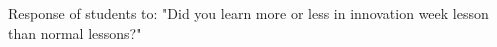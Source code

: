 Response of students to: "Did you learn more or less in innovation week lesson than normal lessons?"